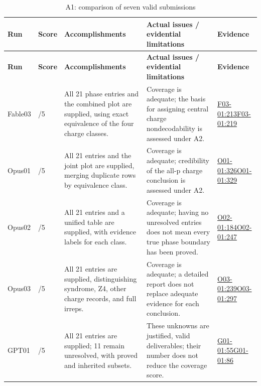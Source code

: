 \documentclass[11pt,a4paper]{article}
\begin{document}
{\fontsize{9.0}{12.6}\selectfont
\setlength{\tabcolsep}{2.5pt}
\begin{longtable}{>{\raggedright\arraybackslash}p{}>{\raggedright\arraybackslash}p{}>{\raggedright\arraybackslash}p{}>{\raggedright\arraybackslash}p{}>{\raggedright\arraybackslash}p{}}
\caption{A1: comparison of seven valid submissions}\\
\toprule
\textbf{Run} & \textbf{Score} & \textbf{Accomplishments} & \textbf{Actual issues /\allowbreak{} evidential limitations} & \textbf{Evidence}\tabularnewline
\midrule
\endfirsthead
\toprule
\textbf{Run} & \textbf{Score} & \textbf{Accomplishments} & \textbf{Actual issues /\allowbreak{} evidential limitations} & \textbf{Evidence}\tabularnewline
\midrule
\endhead
{}Fable03 & 5/\allowbreak{}5 & All 21 phase entries and the combined plot are supplied,\allowbreak{} using exact equivalence of the four charge classes. & Coverage is adequate; the basis for assigning central charge nondecodability is assessed under A2. & \hyperref[src:F03-01]{F03-01:213}\newline \hyperref[src:F03-01]{F03-01:219}\tabularnewline
{}Opus01 & 5/\allowbreak{}5 & All 21 entries and the joint plot are supplied,\allowbreak{} merging duplicate rows by equivalence class. & Coverage is adequate; credibility of the all-p charge conclusion is assessed under A2. & \hyperref[src:O01-01]{O01-01:326}\newline \hyperref[src:O01-01]{O01-01:329}\tabularnewline
{}Opus02 & 5/\allowbreak{}5 & All 21 entries and a unified table are supplied,\allowbreak{} with evidence labels for each class. & Coverage is adequate; having no unresolved entries does not mean every true phase boundary has been proved. & \hyperref[src:O02-01]{O02-01:184}\newline \hyperref[src:O02-01]{O02-01:247}\tabularnewline
{}Opus03 & 5/\allowbreak{}5 & All 21 entries are supplied,\allowbreak{} distinguishing syndrome,\allowbreak{} Z4,\allowbreak{} other charge records,\allowbreak{} and full irreps. & Coverage is adequate; a detailed report does not replace adequate evidence for each conclusion. & \hyperref[src:O03-01]{O03-01:239}\newline \hyperref[src:O03-01]{O03-01:297}\tabularnewline
{}GPT01 & 5/\allowbreak{}5 & All 21 entries are supplied; 11 remain unresolved,\allowbreak{} with proved and inherited subsets. & These unknowns are justified,\allowbreak{} valid deliverables; their number does not reduce the coverage score. & \hyperref[src:G01-01]{G01-01:55}\newline \hyperref[src:G01-01]{G01-01:86}\tabularnewline

\end{longtable}}
\end{document}
